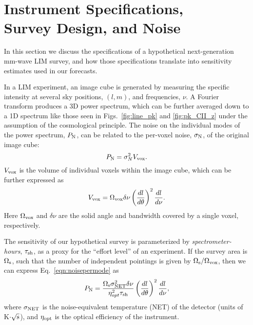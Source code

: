\documentclass[twocolumn]{aastex631}
\begin{document}
\section{Instrument Specifications, \\ 
        Survey Design, and Noise}\label{sec:design}

In this section we discuss the specifications of a hypothetical next-generation mm-wave LIM survey, and how those specifications translate into sensitivity estimates used in our forecasts.

In a LIM experiment, an image cube is generated by measuring the specific intensity at several sky positions, $(l,m)$, and frequencies, $\nu$. A Fourier transform produces a 3D power spectrum, which can be further averaged down to a 1D spectrum like those seen in Figs.~\ref{fig:line_pk} and \ref{fig:pk_CII_z} under the assumption of the cosmological principle. The noise on the individual modes of the power spectrum, $P_{\rm N}$, can be related to the per-voxel noise, $\sigma_{\rm N}$, of the original image cube:
\begin{equation}\label{eqn:noisepermode}
    P_{\rm N} = \sigma_{N}^{2}V_{\rm vox}.
\end{equation}
$V_{\rm vox}$ is the volume of individual voxels within the image cube, which can be further expressed as
\begin{equation}\label{eqn:voxelvolume}
    V_{\rm vox} = \Omega_{\rm vox}\delta\nu \left( \frac{dl}{d\theta} \right )^{2} \frac{dl}{d\nu}.
\end{equation}
Here $\Omega_{\rm vox}$ and $\delta\nu$ are the solid angle and bandwidth covered by a single voxel, respectively.

The sensitivity of our hypothetical survey is parameterized by \textit{spectrometer-hours}, $\tau_{\rm sh}$, as a proxy for the ``effort level'' of an experiment. If the survey area is $\Omega_{\rm s}$, such that the number of independent pointings is given by $\Omega_{\rm s}/\Omega_{\rm vox}$, then we can express Eq.~\eqref{eqn:noisepermode} as
\begin{equation}
    P_{\rm N} = \frac{\Omega_{\rm s} \sigma_{\rm NET}^{2} \delta\nu }{{\eta_{opt}^{2}\tau_{\rm sh}}} \left( \frac{dl}{d\theta} \right )^{2} \frac{dl}{d\nu},
\end{equation}
where $\sigma_{\rm NET}$ is the noise-equivalent temperature (NET) of the detector (units of K$\cdot\sqrt{\rm s}$), and $\eta_{\rm opt}$ is the optical efficiency of the instrument.
\end{document}

